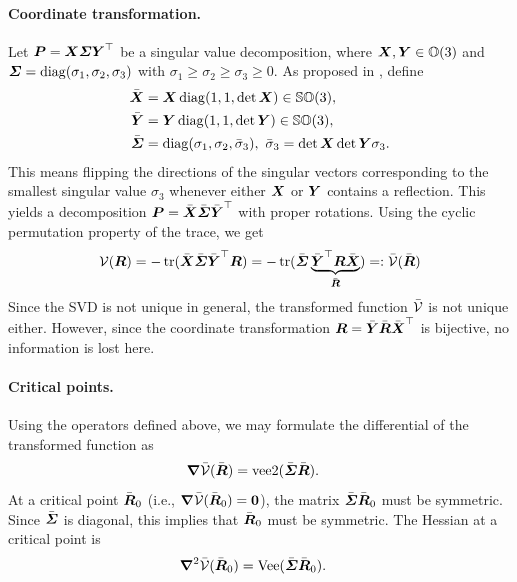 \paragraph{Coordinate transformation.}
Let $\boldsymbol{P} = \boldsymbol{X} \boldsymbol{\varSigma} \boldsymbol{Y}^\top$ be a singular value decomposition, where $\boldsymbol{X}, \boldsymbol{Y} \in \mathbb{O}(3)$ and $\boldsymbol{\varSigma} = \operatorname{diag}(\sigma_1, \sigma_2, \sigma_3)$ with $\sigma_1 \geq \sigma_2 \geq \sigma_3 \geq 0$.
As proposed in \cite{Kabsch:SSVD}, define
\begin{subequations}\label{eq:DefSSVD}
\begin{align}
 \bar{\boldsymbol{X}} &= \boldsymbol{X} \operatorname{diag}(1, 1, \det\boldsymbol{X}) \in \mathbb{SO}(3),
\\
 \bar{\boldsymbol{Y}} &= \boldsymbol{Y} \operatorname{diag}(1, 1, \det\boldsymbol{Y}) \in \mathbb{SO}(3),
\\
 \bar{\boldsymbol{\varSigma}} &= \operatorname{diag}(\sigma_1, \sigma_2, \bar{\sigma}_3), \ \bar{\sigma}_3 = \det\boldsymbol{X}\det\boldsymbol{Y} \sigma_3 .
\end{align}
\end{subequations}
This means flipping the directions of the singular vectors corresponding to the smallest singular value $\sigma_3$ whenever either $\boldsymbol{X}$ or $\boldsymbol{Y}$ contains a reflection.
This yields a decomposition $\boldsymbol{P} = \bar{\boldsymbol{X}} \bar{\boldsymbol{\varSigma}} \bar{\boldsymbol{Y}}^\top$ with proper rotations.
Using the cyclic permutation property of the trace, we get
\begin{align}\label{eq:AttitudePotentialTrafo}
 \mathcal{V}(\boldsymbol{R}) = -\operatorname{tr}( \bar{\boldsymbol{X}} \bar{\boldsymbol{\varSigma}} \bar{\boldsymbol{Y}}^\top \boldsymbol{R}) = -\operatorname{tr}( \bar{\boldsymbol{\varSigma}} \underbrace{\bar{\boldsymbol{Y}}^\top \boldsymbol{R} \bar{\boldsymbol{X}}}_{\bar{\boldsymbol{R}}}) =: \bar{\mathcal{V}}(\bar{\boldsymbol{R}})
\end{align}
Since the SVD is not unique in general, the transformed function $\bar{\mathcal{V}}$ is not unique either.
However, since the coordinate transformation $\boldsymbol{R} = \bar{\boldsymbol{Y}} \bar{\boldsymbol{R}} \bar{\boldsymbol{X}}^\top$ is bijective, no information is lost here.

\paragraph{Critical points.}
Using the operators defined above, we may formulate the differential of the transformed function as
\begin{align}
 \boldsymbol{\nabla} \bar{\mathcal{V}}(\bar{\boldsymbol{R}}) &= \operatorname{vee2}(\bar{\boldsymbol{\varSigma}} \bar{\boldsymbol{R}}).
\end{align}
At a critical point $\bar{\boldsymbol{R}}_0$ (i.e., $\boldsymbol{\nabla} \bar{\mathcal{V}}(\bar{\boldsymbol{R}}_0)=\boldsymbol{0}$), the matrix $\bar{\boldsymbol{\varSigma}} \bar{\boldsymbol{R}}_0$ must be symmetric.
Since $\bar{\boldsymbol{\varSigma}}$ is diagonal, this implies that $\bar{\boldsymbol{R}}_0$ must be symmetric.
The Hessian at a critical point is
\begin{align}
 \boldsymbol{\nabla}^2 \bar{\mathcal{V}}(\bar{\boldsymbol{R}}_0) &= \operatorname{Vee}(\bar{\boldsymbol{\varSigma}} \bar{\boldsymbol{R}}_0).
\end{align}

